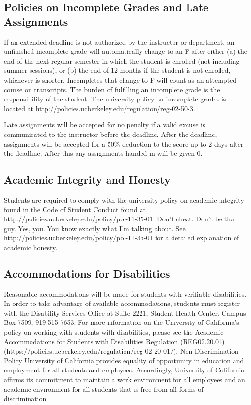 \documentclass[11pt]{article}
\begin{document}
\subsection*{Policies on Incomplete Grades and Late Assignments}
\footnotesize{If an extended deadline is not authorized by the instructor or department, an unfinished incomplete grade will automatically change to an F after either (a) the end of the next regular semester in which the student is enrolled (not including summer sessions), or (b) the end of 12 months if the student is not enrolled, whichever is shorter. Incompletes that change to F will count as an attempted course on transcripts. The burden of fulfilling an incomplete grade is the responsibility of the student. The university policy on incomplete grades is located at http://policies.ucberkeley.edu/regulation/reg-02-50-3.}

\footnotesize{Late assignments will be accepted for no penalty if a valid excuse is communicated to the instructor before the deadline. After the deadline, assignments will be accepted for a 50\% deduction to the score up to 2 days after the deadline. After this any assignments handed in will be given 0.}

\subsection*{Academic Integrity and Honesty}
\footnotesize{Students are required to comply with the university policy on academic integrity found in the Code of Student Conduct found at http://policies.ucberkeley.edu/policy/pol-11-35-01. Don't cheat. Don't be that guy. Yes, you. You know exactly what I'm talking about. See http://policies.ucberkeley.edu/policy/pol-11-35-01 for a detailed explanation of academic honesty.}

\subsection*{Accommodations for Disabilities}
\footnotesize{Reasonable accommodations will be made for students with verifiable disabilities. In order to take advantage of available accommodations, students must register with the Disability Services Office at Suite 2221, Student Health Center, Campus Box 7509, 919-515-7653. For more information on the University of California's policy on working with students with disabilities, please see the Academic Accommodations for Students with Disabilities Regulation (REG02.20.01) (https://policies.ucberkeley.edu/regulation/reg-02-20-01/).
Non-Discrimination Policy University of California provides equality of opportunity in education and employment for all students and employees. Accordingly, University of California affirms its commitment to maintain a work environment for all employees and an academic environment for all students that is free from all forms of discrimination.}
\end{document}
